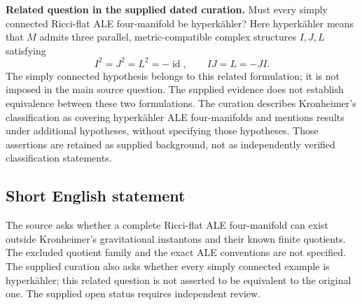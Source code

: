 \documentclass[11pt]{article}
\begin{document}
\medskip
\textbf{Related question in the supplied dated curation.} Must every simply connected Ricci-flat ALE four-manifold be hyperkähler? Here hyperkähler means that $M$ admits three parallel, metric-compatible complex structures $I,J,L$ satisfying
\[
I^2=J^2=L^2=-\operatorname{id},\qquad IJ=L=-JI.
\]
The simply connected hypothesis belongs to this related formulation; it is not imposed in the main source question. The supplied evidence does not establish equivalence between these two formulations. The curation describes Kronheimer's classification as covering hyperkähler ALE four-manifolds and mentions results under additional hypotheses, without specifying those hypotheses. Those assertions are retained as supplied background, not as independently verified classification statements.
\subsection{Short English statement}
The source asks whether a complete Ricci-flat ALE four-manifold can exist outside Kronheimer's gravitational instantons and their known finite quotients. The excluded quotient family and the exact ALE conventions are not specified. The supplied curation also asks whether every simply connected example is hyperkähler; this related question is not asserted to be equivalent to the original one. The supplied open status requires independent review.
\end{document}
